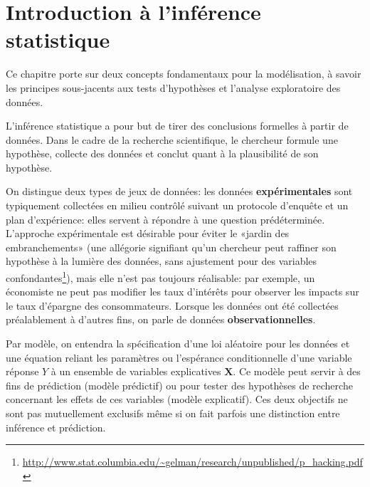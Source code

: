 \documentclass[
  11pt,
  letterpaper,
]{book}
\renewcommand{\href}[2]{#2\footnote{\url{#1}}}
\theoremstyle{definition}
\theoremstyle{definition}
\theoremstyle{definition}
\theoremstyle{remark}
\begin{document}
\newcommand{\bs}[1]{\boldsymbol{#1}}
\newcommand{\Hmat}{\mathbf{H}}
\newcommand{\Mmat}{\mathbf{M}}
\newcommand{\mX}{\mathbf{X}}
\newcommand{\bX}{{\mathbf{X}}}
\newcommand{\bx}{{\mathbf{x}}}
\newcommand{\by}{{\boldsymbol{y}}}
\newcommand{\bY}{{\boldsymbol{Y}}}
\newcommand{\eps}{\varepsilon}
\newcommand{\beps}{\boldsymbol{\varepsilon}}
\newcommand{\bbeta}{\boldsymbol{\beta}}
\newcommand{\hbb}{\widehat{\boldsymbol{\beta}}}
\newcommand{\limni}{\lim_{n \ra \infty}}
\newcommand{\pr}{{\mathsf Pr}{}}
\renewcommand{\P}[2][]{{\mathsf P}_{#1}\left(#2\right)}
\newcommand{\E}[2][]{{\mathsf E}_{#1}\left(#2\right)}
\newcommand{\Va}[2][]{{\mathsf{Var}_{#1}}\left(#2\right)}
\newcommand{\I}[1]{{\mathbf 1}_{#1}}
\renewcommand{\d}{\mathrm{d}}

\hypertarget{intro}{%
\chapter{Introduction à l'inférence statistique}\label{intro}}

Ce chapitre porte sur deux concepts fondamentaux pour la modélisation, à savoir les principes sous-jacents aux tests d'hypothèses et l'analyse exploratoire des données.

L'inférence statistique a pour but de tirer des conclusions formelles à partir de données. Dans le cadre de la recherche scientifique, le chercheur formule une hypothèse, collecte des données et conclut quant à la plausibilité de son hypothèse.

On distingue deux types de jeux de données: les données \textbf{expérimentales} sont typiquement collectées en milieu contrôlé suivant un protocole d'enquête et un plan d'expérience: elles servent à répondre à une question prédéterminée. L'approche expérimentale est désirable pour éviter le «jardin des embranchements» (une \href{http://www.stat.columbia.edu/~gelman/research/unpublished/p_hacking.pdf}{allégorie signifiant qu'un chercheur peut raffiner son hypothèse à la lumière des données, sans ajustement pour des variables confondantes}), mais elle n'est pas toujours réalisable: par exemple, un économiste ne peut pas modifier les taux d'intérêts pour observer les impacts sur le taux d'épargne des consommateurs. Lorsque les données ont été collectées préalablement à d'autres fins, on parle de données \textbf{observationnelles}.

Par modèle, on entendra la spécification d'une loi aléatoire pour les données et une équation reliant les paramètres ou l'espérance conditionnelle d'une variable réponse \(Y\) à un ensemble de variables explicatives \(\mathbf{X}\). Ce modèle peut servir à des fins de prédiction (modèle prédictif) ou pour tester des hypothèses de recherche concernant les effets de
ces variables (modèle explicatif). Ces deux objectifs ne sont pas mutuellement exclusifs même si on fait parfois une distinction entre inférence et prédiction.
\end{document}
